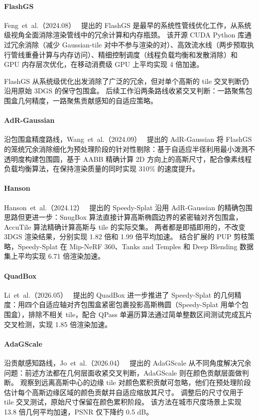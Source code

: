 \paragraph{FlashGS}
Feng~et~al.（2024.08）~\cite{2408_07967} 提出的 FlashGS 是最早的系统性管线优化工作，从系统级视角全面消除渲染管线中的冗余计算和内存瓶颈。
该开源 CUDA Python 库通过冗余消除（减少 Gaussian-tile 对中不参与渲染的对）、高效流水线（两步预取执行管线重叠计算与内存访问）、精细控制调度（线程负载均衡和发散消除）和 GPU 内存层次优化，在移动消费级 GPU 上平均实现 4 倍加速。

FlashGS 从系统级优化出发消除了广泛的冗余，但对单个高斯的 tile 交叉判断仍沿用原始 3DGS 的保守包围盒。
后续工作沿两条路线收紧交叉判断：一路聚焦包围盒几何精度，一路聚焦贡献感知的自适应策略。

\paragraph{AdR-Gaussian}
沿包围盒精度路线，Wang~et~al.（2024.09）~\cite{2409_08669} 提出的 AdR-Gaussian 将 FlashGS 的笼统冗余消除细化为预处理阶段的针对性剔除：基于自适应半径利用最小泼溅不透明度构建包围圆，基于 AABB 精确计算 2D 方向上的高斯尺寸，配合像素线程负载均衡算法，在保持渲染质量的同时实现 310\% 的速度提升。
\paragraph{Hanson}\label{par:hanson}

Hanson~et~al.（2024.12）~\cite{2412_00578} 提出的 Speedy-Splat 沿用 AdR-Gaussian 的精确包围思路但更进一步：SnugBox 算法直接计算高斯椭圆边界的紧密轴对齐包围盒，AccuTile 算法精确计算高斯与 tile 的实际交集。
两者都是即插即用的，不改变 3DGS 渲染结果，分别实现 1.82 倍和 1.99 倍平均加速。
结合扩展的 PUP 剪枝策略，Speedy-Splat 在 Mip-NeRF 360、Tanks and Temples 和 Deep Blending 数据集上平均实现 6.71 倍渲染加速。
\paragraph{QuadBox}

Li~et~al.（2026.05）~\cite{2605_04844} 提出的 QuadBox 进一步推进了 Speedy-Splat 的几何精度：用四个自适应轴对齐包围盒紧密包裹投影高斯椭圆（Speedy-Splat 用单个包围盒），排除不相关 tile，配合 QPass 单遍历算法通过简单整数区间测试完成瓦片交叉检测，实现 1.85 倍渲染加速。

\paragraph{AdaGScale}
沿贡献感知路线，Jo~et~al.（2026.04）~\cite{2604_18980} 提出的 AdaGScale 从不同角度解决冗余问题：前述方法都在几何层面收紧交叉判断，AdaGScale 则在颜色贡献层面做判断。
观察到远离高斯中心的边缘 tile 对颜色累积贡献可忽略，他们在预处理阶段估计每个高斯边缘区域的颜色贡献并自适应缩放其尺寸。
调整后的尺寸仅用于 tile 交叉测试，原始尺寸保留在颜色累积阶段。
该方法在城市尺度场景上实现 13.8 倍几何平均加速，PSNR 仅下降约 0.5 dB。

